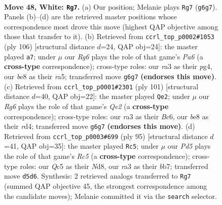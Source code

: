 \documentclass[11pt]{article}
\begin{document}
\clearpage

\begin{figure}[p]\centering
\begin{subfigure}{0.46\textwidth}\centering
\resizebox{\linewidth}{!}{%
\newchessgame
\chessboard[
  setfen={3kb3/8/6R1/2QP4/8/r5p1/P1P1p1P1/4K3 w - - 5 48},
  showmover=false,
  pgfstyle=straightmove, color=movearrow, markmove={g6-g7}
]}
\caption{}
\end{subfigure}\hfill
\begin{subfigure}{0.46\textwidth}\centering
\resizebox{\linewidth}{!}{%
\newchessgame
\chessboard[
  setfen={4r3/1Pb5/P1k5/r7/6p1/1QP1p2P/4K3/8 w - - 0 54},
  showmover=false,
  pgfstyle=straightmove, color=movearrow, markmove={a6-a7}
]}
\caption{}
\end{subfigure}
\\[4pt]
\begin{subfigure}{0.46\textwidth}\centering
\resizebox{\linewidth}{!}{%
\newchessgame
\chessboard[
  setfen={8/1p2qk2/2b5/p7/3R2p1/2R3B1/1P4P1/6K1 b - - 3 51},
  showmover=false,
  pgfstyle=straightmove, color=movearrow, markmove={e7-e2}
]}
\caption{}
\end{subfigure}\hfill
\begin{subfigure}{0.46\textwidth}\centering
\resizebox{\linewidth}{!}{%
\newchessgame
\chessboard[
  setfen={3n4/1B4k1/p6p/P3P3/2r3Pp/1R5K/8/8 b - - 0 48},
  showmover=false,
  pgfstyle=straightmove, color=movearrow, markmove={c4-c5}
]}
\caption{}
\end{subfigure}
\caption{\textbf{Move 48, White: \texttt{Rg7}.} (a) Our position; Melanie plays \texttt{Rg7} (\texttt{g6g7}). Panels (b)--(d) are the retrieved master positions whose correspondence most drove this move (highest QAP objective among those that transfer to it). (b) Retrieved from \texttt{ccrl\_top\_p0002\#1053} (ply 106) [structural distance $d$=24, QAP obj=24]: the master played \texttt{a7}; under $\mu$ our \emph{Rg6} plays the role of that game's \emph{Pa6} (a \textbf{cross-type} correspondence); cross-type roles: our \emph{r}a3 as their \emph{p}g4, our \emph{b}e8 as their \emph{r}a5; transferred move \texttt{g6g7} \textbf{(endorses this move)}. (c) Retrieved from \texttt{ccrl\_top\_p0001\#2301} (ply 101) [structural distance $d$=40, QAP obj=22]: the master played \texttt{Qe2}; under $\mu$ our \emph{Rg6} plays the role of that game's \emph{Qe2} (a \textbf{cross-type} correspondence); cross-type roles: our \emph{r}a3 as their \emph{B}c6, our \emph{b}e8 as their \emph{r}d4; transferred move \texttt{g6g7} \textbf{(endorses this move)}. (d) Retrieved from \texttt{ccrl\_top\_p0003\#699} (ply 95) [structural distance $d$=41, QAP obj=35]: the master played \texttt{Rc5}; under $\mu$ our \emph{Pd5} plays the role of that game's \emph{Rc5} (a \textbf{cross-type} correspondence); cross-type roles: our \emph{Q}c5 as their \emph{N}d8, our \emph{r}a3 as their \emph{b}b7; transferred move \texttt{d5d6}. Synthesis: 2 retrieved analogs transferred to \texttt{Rg7} (summed QAP objective 45, the strongest correspondence among the candidate moves); Melanie committed it via the \texttt{search} selector.}
\label{fig:thought-m94}
\end{figure}
\end{document}
